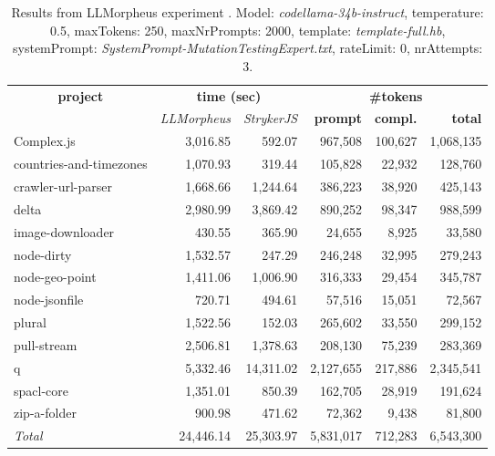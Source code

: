 
\begin{table*}[hbt!]
\centering
{\scriptsize
\begin{tabular}{l||r|r|r|r|r}
\multicolumn{1}{c|}{\bf project} & \multicolumn{2}{|c|}{\bf time (sec)} & \multicolumn{3}{|c|}{\bf \#tokens} \\
               & {\it LLMorpheus} & {\it StrykerJS} & {\bf prompt} & {\bf compl.} & {\bf total} \\
\hline
  Complex.js & 3,016.85 & 592.07 & 967,508 & 100,627 & 1,068,135 \\ 
countries-and-timezones & 1,070.93 & 319.44 & 105,828 & 22,932 & 128,760 \\ 
crawler-url-parser & 1,668.66 & 1,244.64 & 386,223 & 38,920 & 425,143 \\ 
delta & 2,980.99 & 3,869.42 & 890,252 & 98,347 & 988,599 \\ 
image-downloader & 430.55 & 365.90 & 24,655 & 8,925 & 33,580 \\ 
node-dirty & 1,532.57 & 247.29 & 246,248 & 32,995 & 279,243 \\ 
node-geo-point & 1,411.06 & 1,006.90 & 316,333 & 29,454 & 345,787 \\ 
node-jsonfile & 720.71 & 494.61 & 57,516 & 15,051 & 72,567 \\ 
plural & 1,522.56 & 152.03 & 265,602 & 33,550 & 299,152 \\ 
pull-stream & 2,506.81 & 1,378.63 & 208,130 & 75,239 & 283,369 \\ 
q & 5,332.46 & 14,311.02 & 2,127,655 & 217,886 & 2,345,541 \\ 
spacl-core & 1,351.01 & 850.39 & 162,705 & 28,919 & 191,624 \\ 
zip-a-folder & 900.98 & 471.62 & 72,362 & 9,438 & 81,800 \\ 
\hline
  \textit{Total} & 24,446.14 & 25,303.97 & 5,831,017 & 712,283 & 6,543,300 \\
  \end{tabular}
  }
  \\[2mm]
  \caption{Results from LLMorpheus experiment .
    Model: \textit{codellama-34b-instruct}, 
    temperature: 0.5, 
    maxTokens: 250, 
    maxNrPrompts: 2000, 
    template: \textit{template-full.hb}, 
    systemPrompt: \textit{SystemPrompt-MutationTestingExpert.txt}, 
    rateLimit: 0, 
    nrAttempts: 3.  
  }
  \label{table:Cost:run318:codellama-34b-instruct:template-full.hb:0.5}
\end{table*}